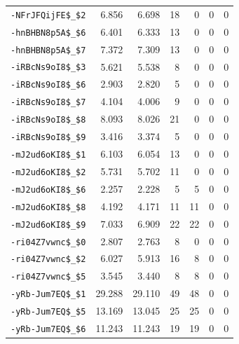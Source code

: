 \begin{longtable}{@{}lrrrrrr@{}}
\nolinkurl{-NFrJFQijFE$_$2} & 6.856 & 6.698 & 18 & 0 & 0 & 0\\
\nolinkurl{-hnBHBN8p5A$_$6} & 6.401 & 6.333 & 13 & 0 & 0 & 0\\
\nolinkurl{-hnBHBN8p5A$_$7} & 7.372 & 7.309 & 13 & 0 & 0 & 0\\
\nolinkurl{-iRBcNs9oI8$_$3} & 5.621 & 5.538 & 8 & 0 & 0 & 0\\
\nolinkurl{-iRBcNs9oI8$_$6} & 2.903 & 2.820 & 5 & 0 & 0 & 0\\
\nolinkurl{-iRBcNs9oI8$_$7} & 4.104 & 4.006 & 9 & 0 & 0 & 0\\
\nolinkurl{-iRBcNs9oI8$_$8} & 8.093 & 8.026 & 21 & 0 & 0 & 0\\
\nolinkurl{-iRBcNs9oI8$_$9} & 3.416 & 3.374 & 5 & 0 & 0 & 0\\
\nolinkurl{-mJ2ud6oKI8$_$1} & 6.103 & 6.054 & 13 & 0 & 0 & 0\\
\nolinkurl{-mJ2ud6oKI8$_$2} & 5.731 & 5.702 & 11 & 0 & 0 & 0\\
\nolinkurl{-mJ2ud6oKI8$_$6} & 2.257 & 2.228 & 5 & 5 & 0 & 0\\
\nolinkurl{-mJ2ud6oKI8$_$8} & 4.192 & 4.171 & 11 & 11 & 0 & 0\\
\nolinkurl{-mJ2ud6oKI8$_$9} & 7.033 & 6.909 & 22 & 22 & 0 & 0\\
\nolinkurl{-ri04Z7vwnc$_$0} & 2.807 & 2.763 & 8 & 0 & 0 & 0\\
\nolinkurl{-ri04Z7vwnc$_$2} & 6.027 & 5.913 & 16 & 8 & 0 & 0\\
\nolinkurl{-ri04Z7vwnc$_$5} & 3.545 & 3.440 & 8 & 8 & 0 & 0\\
\nolinkurl{-yRb-Jum7EQ$_$1} & 29.288 & 29.110 & 49 & 48 & 0 & 0\\
\nolinkurl{-yRb-Jum7EQ$_$5} & 13.169 & 13.045 & 25 & 25 & 0 & 0\\
\nolinkurl{-yRb-Jum7EQ$_$6} & 11.243 & 11.243 & 19 & 19 & 0 & 0\\
\end{longtable}
\endgroup
